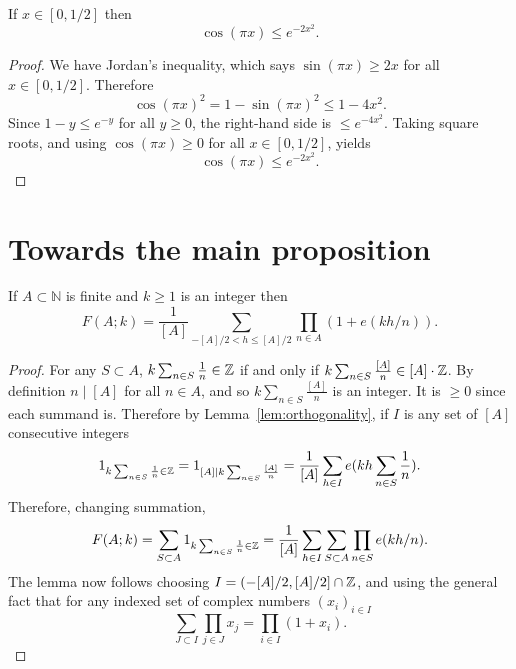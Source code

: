 \begin{lemma}\label{lem:cos_bound}
  \leanok
If $x\in [0,1/2]$ then
\[\cos(\pi x) \leq e^{-2x^2}.\]
\end{lemma}
\begin{proof}
  \leanok
We have Jordan's inequality, which says $\sin(\pi x)\geq 2x$ for all $x\in[0,1/2]$. Therefore
\[\cos(\pi x)^2 = 1-\sin(\pi x)^2\leq 1-4x^2.\]
Since $1-y\leq e^{-y}$ for all $y\geq 0$, the right-hand side is $\leq e^{-4x^2}$. Taking square roots, and using $\cos(\pi x)\geq 0$ for all $x\in[0,1/2]$, yields
\[\cos(\pi x) \leq e^{-2x^2}.\]
\end{proof}

\section{Towards the main proposition}

\begin{lemma}\label{lem:orthog_rat}
  \leanok
If $A\subset\mathbb{N}$ is finite and $k\geq 1$ is an integer then
\[F(A;k)= \frac{1}{[A]}\sum_{-[A]/2< h\leq [A]/2}\prod_{n\in A}(1+e(kh/n)).\]
\end{lemma}
\begin{proof}
For any $S\subset A$,  $k\sum_{n\in S}\frac{1}{n}\in \mathbb{Z}$ if and only if $k\sum_{n\in S}\frac{[A]}{n}\in [A]\cdot \mathbb{Z}$. By definition $n\mid [A]$ for all $n\in A$, and so $k\sum_{n\in S}\frac{[A]}{n}$ is an integer. It is $\geq 0$ since each summand is. Therefore by Lemma~\ref{lem:orthogonality}, if $I$ is any set of $[A]$ consecutive integers
\[1_{k\sum_{n\in S}\frac{1}{n}\in \mathbb{Z}}=1_{[A]\mid k\sum_{n\in S}\frac{[A]}{n}} = \frac{1}{[A]}\sum_{h\in I}e(kh\sum_{n\in S}\frac{1}{n}).\]
Therefore, changing summation,
\[F(A;k) = \sum_{S\subset A}1_{k\sum_{n\in S}\frac{1}{n}\in \mathbb{Z}} = \frac{1}{[A]} \sum_{h\in I}\sum_{S\subset A}\prod_{n\in S}e(kh/n).\]
The lemma now follows choosing $I=(-[A]/2,[A]/2]\cap\mathbb{Z}$, and using the general fact that for any indexed set of complex numbers $(x_i)_{i\in I}$
\[\sum_{J\subset I}\prod_{j\in J}x_j = \prod_{i\in I}(1+x_i).\]
\end{proof}


